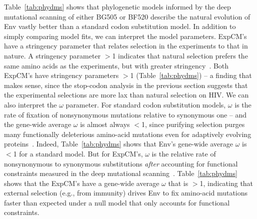 \documentclass[9pt]{elife}
\begin{document}
Table~\ref{tab:phydms} shows that phylogenetic models informed by the deep mutational scanning of either BG505 or BF520 describe the natural evolution of Env vastly better than a standard codon substitution model.
In addition to simply comparing model fits, we can interpret the model parameters.
ExpCM's have a stringency parameter that relates selection in the experiments to that in nature.
A stringency parameter $>$1 indicates that natural selection prefers the same amino acids as the experiments, but with greater stringency~\citep{hilton2017phydms}.
Both ExpCM's have stringency parameters $>$1 (Table~\ref{tab:phydms}) -- a finding that makes sense, since the stop-codon analysis in the previous section suggests that the experimental selections are more lax than natural selection on HIV.
We can also interpret the $\omega$ parameter.
For standard codon substitution models, $\omega$ is the rate of fixation of nonsynonymous mutations relative to synonymous one -- and the gene-wide average $\omega$ is almost always $<$1, since purifying selection purges many functionally deleterious amino-acid mutations even for adaptively evolving proteins~\citep{murrell2015gene}.
Indeed, Table~\ref{tab:phydms} shows that Env's gene-wide average $\omega$ is $<$1 for a standard model.
But for ExpCM's, $\omega$ is the relative rate of nonsynonymous to synonymous substitutions \emph{after} accounting for functional constraints measured in the deep mutational scanning~\citep{bloom2017identification}.
Table~\ref{tab:phydms} shows that the ExpCM's have a gene-wide average $\omega$ that is $>$1, indicating that external selection (e.g., from immunity) drives Env to fix amino-acid mutations faster than expected under a null model that only accounts for functional constraints.
\end{document}
